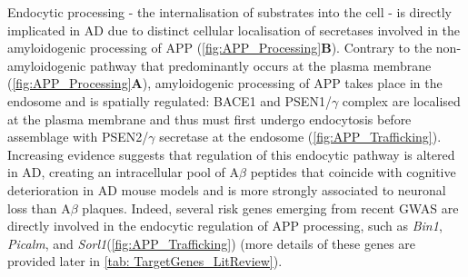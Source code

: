 \newpage
{} 
Endocytic processing - the internalisation of substrates into the cell - is directly implicated in AD due to distinct cellular localisation of secretases involved in the amyloidogenic processing of APP\cite{Acker2019} (\cref{fig:APP_Processing}\textbf{B}). Contrary to the non-amyloidogenic pathway that predominantly occurs at the plasma membrane\cite{Sisodia1992} (\cref{fig:APP_Processing}\textbf{A}), amyloidogenic processing of APP takes place in the endosome and is spatially regulated: BACE1 and PSEN1/$\gamma$ complex are localised at the plasma membrane and thus must first undergo endocytosis before assemblage with PSEN2/$\gamma$ secretase at the endosome (\cref{fig:APP_Trafficking}). Increasing evidence suggests that regulation of this endocytic pathway is altered in AD, creating an intracellular pool of A$\beta$ peptides \cite{Peric2015} that coincide with cognitive deterioration in AD mouse models \cite{Tomiyama2010,Knobloch2007,Billings2005} and is more strongly associated to neuronal loss than A$\beta$ plaques\cite{Christensen2008}. Indeed, several risk genes emerging from recent GWAS are directly involved in the endocytic regulation of APP processing, such as \textit{Bin1}, \textit{Picalm}, and \textit{Sorl1}\cite{Schmidt2016,Dumanis2015}(\cref{fig:APP_Trafficking}) (more details of these genes are provided later in \cref{tab: TargetGenes_LitReview}).   

